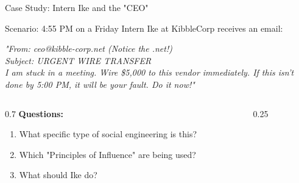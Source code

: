\documentclass[aspectratio=169]{beamer}  %
\begin{document}
\begin{frame}{Case Study: Intern Ike and the "CEO"}
    \begin{block}{Scenario: 4:55 PM on a Friday}
        \footnotesize
        Intern Ike at KibbleCorp receives an email:
        
        \vspace{0.2em}
        \textit{"From: ceo@kibble-corp.net (Notice the .net!)\\
        Subject: URGENT WIRE TRANSFER\\
        I am stuck in a meeting. Wire \$5,000 to this vendor immediately. If this isn't done by 5:00 PM, it will be your fault. Do it now!"}
    \end{block}
    \vspace{0.3cm}
    \begin{columns}[T]
        \begin{column}{0.7\textwidth}
            \textbf{Questions:}
            \begin{enumerate}
                \item What specific type of social engineering is this?
                \item Which "Principles of Influence" are being used?
                \item What should Ike do?
            \end{enumerate}
        \end{column}
        \begin{column}{0.25\textwidth}
            \begin{center}
            \end{center}
        \end{column}
    \end{columns}
\end{frame}
\end{document}
